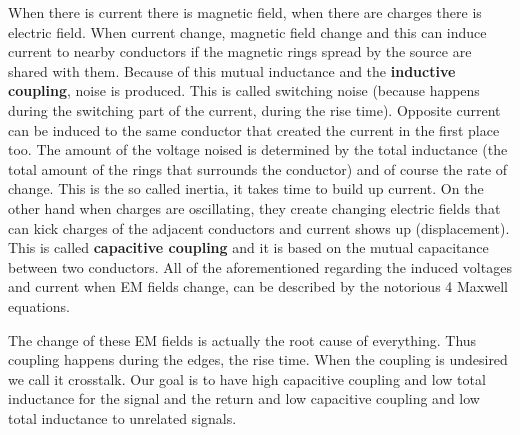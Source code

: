 \documentclass[12pt]{article}
\begin{document}






When there is current there is magnetic field, when there are charges there is electric field. When current change, magnetic field change and this can induce current to nearby conductors if the magnetic rings spread by the source are shared with them. Because of this mutual inductance and the \textbf{inductive coupling}, noise is produced. This is called switching noise (because happens during the switching part of the current, during the rise time). Opposite current can be induced to the same conductor that created the current in the first place too. The amount of the voltage noised is determined by the total inductance (the total amount of the rings that surrounds the conductor) and of course the rate of change. This is the so called inertia, it takes time to build up current. On the other hand when charges are oscillating, they create changing electric fields that can kick charges of the adjacent conductors and current shows up (displacement). This is called \textbf{capacitive coupling} and it is based on the mutual capacitance between two conductors. All of the aforementioned regarding the induced voltages and current when EM fields change, can be described by the notorious 4 Maxwell equations.

The change of these EM fields is actually the root cause of everything. Thus coupling happens during the edges, the rise time. When the coupling is undesired we call it crosstalk. Our goal is to have high capacitive coupling and low total inductance for the signal and the return and low capacitive coupling and low total inductance to unrelated signals.
\end{document}
